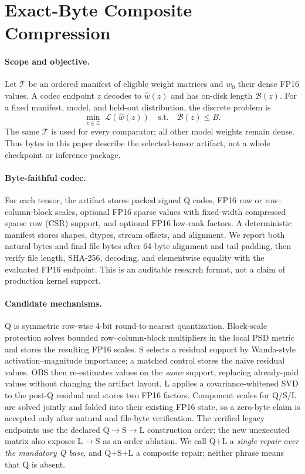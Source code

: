 \section{Exact-Byte Composite Compression}
\label{sec:method}

\paragraph{Scope and objective.}
Let $\mathcal{T}$ be an ordered manifest of eligible weight matrices and
$w_0$ their dense FP16 values.  A codec endpoint $z$ decodes to
$\widehat w(z)$ and has on-disk length $\mathcal{B}(z)$.  For a fixed
manifest, model, and held-out distribution, the discrete problem is
\begin{equation}
  \min_{z\in\mathcal{Z}}\;
  \mathcal{L}(\widehat w(z))
  \quad\text{s.t.}\quad \mathcal{B}(z)\le B.
  \label{eq:discrete-rate}
\end{equation}
The same $\mathcal{T}$ is used for every comparator; all other model weights
remain dense.  Thus bytes in this paper describe the selected-tensor artifact,
not a whole checkpoint or inference package.

\paragraph{Byte-faithful codec.}
For each tensor, the artifact stores packed signed Q codes, FP16 row or
row--column-block scales, optional FP16 sparse values with fixed-width
compressed sparse row (CSR)
support, and optional FP16 low-rank factors.  A deterministic manifest stores
shapes, dtypes, stream offsets, and alignment.  We report both natural bytes
and final file bytes after 64-byte alignment and tail padding, then verify file
length, SHA-256, decoding, and elementwise equality with the evaluated FP16
endpoint.  This is an auditable research format, not a claim of production
kernel support.

\paragraph{Candidate mechanisms.}
Q is symmetric row-wise 4-bit round-to-nearest quantization.  Block-scale
protection solves bounded row--column-block multipliers in the local PSD
metric and stores the resulting FP16 scales.  S selects a residual support by
Wanda-style activation--magnitude importance; a matched control stores the
naive residual values.  OBS then re-estimates values on the \emph{same}
support, replacing already-paid values without changing the artifact layout.
L applies a covariance-whitened SVD to the post-Q residual and stores two FP16
factors.  Component scales for Q/S/L are solved jointly and folded into their
existing FP16 state, so a zero-byte claim is accepted only after natural and
file-byte verification.  The verified legacy endpoints use the declared
Q$\rightarrow$S$\rightarrow$L construction order; the new unexecuted matrix
also exposes L$\rightarrow$S as an order ablation.  We call Q+L a
\emph{single repair over the mandatory Q
base}, and Q+S+L a composite repair; neither phrase means that Q is absent.

